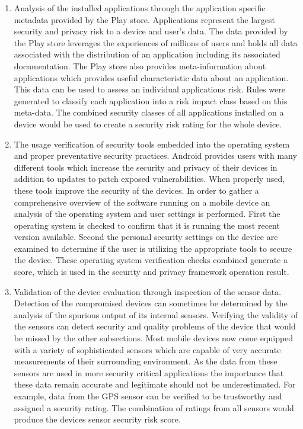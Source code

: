 \begin{enumerate}
\item Analysis of the installed applications through the application specific metadata provided by the Play store. Applications represent the largest security and privacy risk to a device and user's data. The data provided by the Play store leverages the experiences of millions of users and holds all data associated with the distribution of an application including its associated documentation. The Play store also provides meta-information about applications which provides useful characteristic data about an application. This data can be used to assess an individual applications risk. Rules were generated to classify each application into a risk impact class based on this meta-data. The combined security classes of all applications installed on a device would be used to create a security risk rating for the whole device.

\item The usage verification of security tools embedded into the operating system and proper preventative security practices. Android provides users with many different tools which increase the security and privacy of their devices in addition to updates to patch exposed vulnerabilities. When properly used, these tools improve the security of the devices. In order to gather a comprehensive overview of the software running on a mobile device an analysis of the operating system and user settings is performed. First the operating system is checked to confirm that it is running the most recent version available. Second the personal security settings on the device are examined to determine if the user is utilizing the appropriate tools to secure the device. These operating system verification checks combined generate a score, which is used in the security and privacy framework operation result.

\item Validation of the device evaluation through inspection of the sensor data. Detection of the compromised devices can sometimes be determined by the analysis of the spurious output of its internal sensors. Verifying the validity of the sensors can detect security and quality problems of the device that would be missed by the other subsections. Most mobile devices now come equipped with a variety of sophisticated sensors which are capable of very accurate measurements of their surrounding environment. As the data from these sensors are used in more security critical applications the importance that these data remain accurate and legitimate should not be underestimated. For example, data from the GPS sensor can be verified to be trustworthy and assigned a security rating. The combination of ratings from all sensors would produce the devices sensor security risk score.
\end{enumerate}


